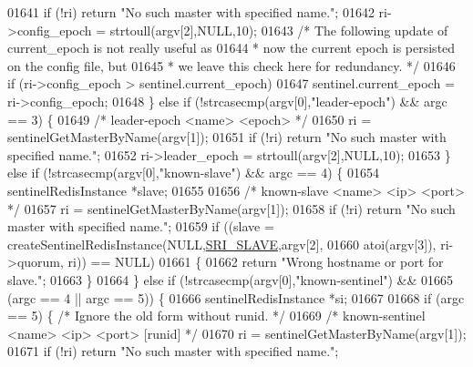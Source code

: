 \begin{DoxyCode}
{{{{{{{{{{{{{{{{{{01641         \textcolor{keywordflow}{if} (!ri) \textcolor{keywordflow}{return} \textcolor{stringliteral}{"No such master with specified name."};
01642         ri->config\_epoch = strtoull(argv[2],NULL,10);
01643         \textcolor{comment}{/* The following update of current\_epoch is not really useful as}
01644 \textcolor{comment}{         * now the current epoch is persisted on the config file, but}
01645 \textcolor{comment}{         * we leave this check here for redundancy. */}
01646         \textcolor{keywordflow}{if} (ri->config\_epoch > sentinel.current\_epoch)
01647             sentinel.current\_epoch = ri->config\_epoch;
01648     \} \textcolor{keywordflow}{else} \textcolor{keywordflow}{if} (!strcasecmp(argv[0],\textcolor{stringliteral}{"leader-epoch"}) && argc == 3) \{
01649         \textcolor{comment}{/* leader-epoch <name> <epoch> */}
01650         ri = sentinelGetMasterByName(argv[1]);
01651         \textcolor{keywordflow}{if} (!ri) \textcolor{keywordflow}{return} \textcolor{stringliteral}{"No such master with specified name."};
01652         ri->leader\_epoch = strtoull(argv[2],NULL,10);
01653     \} \textcolor{keywordflow}{else} \textcolor{keywordflow}{if} (!strcasecmp(argv[0],\textcolor{stringliteral}{"known-slave"}) && argc == 4) \{
01654         sentinelRedisInstance *slave;
01655 
01656         \textcolor{comment}{/* known-slave <name> <ip> <port> */}
01657         ri = sentinelGetMasterByName(argv[1]);
01658         \textcolor{keywordflow}{if} (!ri) \textcolor{keywordflow}{return} \textcolor{stringliteral}{"No such master with specified name."};
01659         \textcolor{keywordflow}{if} ((slave = createSentinelRedisInstance(NULL,\hyperlink{sentinel_8c_a4b9db21eda79d49bd9fdf2cf7b3178e8}{SRI\_SLAVE},argv[2],
01660                     atoi(argv[3]), ri->quorum, ri)) == NULL)
01661         \{
01662             \textcolor{keywordflow}{return} \textcolor{stringliteral}{"Wrong hostname or port for slave."};
01663         \}
01664     \} \textcolor{keywordflow}{else} \textcolor{keywordflow}{if} (!strcasecmp(argv[0],\textcolor{stringliteral}{"known-sentinel"}) &&
01665                (argc == 4 || argc == 5)) \{
01666         sentinelRedisInstance *si;
01667 
01668         \textcolor{keywordflow}{if} (argc == 5) \{ \textcolor{comment}{/* Ignore the old form without runid. */}
01669             \textcolor{comment}{/* known-sentinel <name> <ip> <port> [runid] */}
01670             ri = sentinelGetMasterByName(argv[1]);
01671             \textcolor{keywordflow}{if} (!ri) \textcolor{keywordflow}{return} \textcolor{stringliteral}{"No such master with specified name."};
}}}}}}}}}}}}}}}}}}
\end{DoxyCode}
